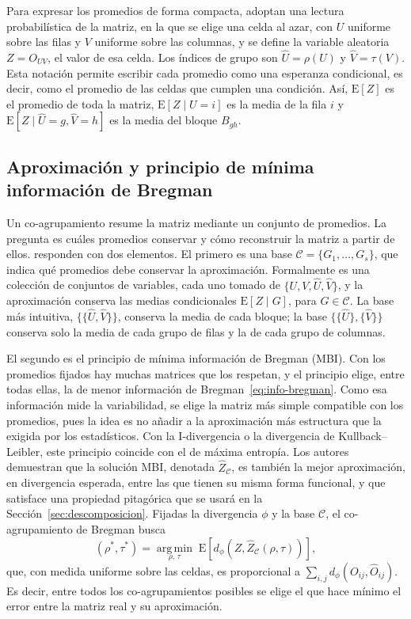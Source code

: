 Para expresar los promedios de forma compacta, \citet{Banerjee2007} adoptan una
lectura probabilística de la matriz, en la que se elige una celda al azar, con $U$ uniforme
sobre las filas y $V$ uniforme sobre las columnas, y se define la variable
aleatoria $Z = O_{UV}$, el valor de esa celda. Los índices de grupo son
$\hat{U} = \rho(U)$ y $\hat{V} = \tau(V)$. Esta notación permite escribir cada
promedio como una esperanza condicional, es decir, como el promedio de las celdas
que cumplen una condición. Así, $\mathrm{E}[Z]$ es el promedio de toda la matriz,
$\mathrm{E}[Z \mid U = i]$ es la media de la fila $i$ y
$\mathrm{E}[Z \mid \hat{U} = g, \hat{V} = h]$ es la media del bloque $B_{gh}$.

\subsection{Aproximación y principio de mínima información de Bregman}

Un co-agrupamiento resume la matriz mediante un conjunto de promedios. La pregunta
es cuáles promedios conservar y cómo reconstruir la matriz a partir de ellos.
\citet{Banerjee2007} responden con dos elementos. El primero es una base
$\mathcal{C} = \{G_1, \dots, G_s\}$, que indica qué
promedios debe conservar la aproximación. Formalmente es una colección de
conjuntos de variables, cada uno tomado de $\{U, V, \hat{U}, \hat{V}\}$, y la
aproximación conserva las medias condicionales $\mathrm{E}[Z \mid G]$, para
$G \in \mathcal{C}$. La base más intuitiva, $\{\{\hat{U}, \hat{V}\}\}$, conserva la
media de cada bloque; la base $\{\{\hat{U}\}, \{\hat{V}\}\}$ conserva solo la media
de cada grupo de filas y la de cada grupo de columnas.

El segundo es el principio de mínima información de Bregman (MBI). Con los
promedios fijados hay muchas matrices que los respetan, y el principio elige,
entre todas ellas, la de menor información de Bregman~\eqref{eq:info-bregman}.
Como esa información mide la variabilidad, se elige la matriz más simple
compatible con los promedios, pues la idea es no añadir a la aproximación más
estructura que la exigida por los estadísticos. Con la
I-divergencia o la divergencia de Kullback--Leibler, este principio coincide con el
de máxima entropía. Los autores demuestran que la solución MBI, denotada
$\hat{Z}_{\mathcal{C}}$, es también la mejor aproximación, en divergencia esperada,
entre las que tienen su misma forma funcional, y que satisface una propiedad
pitagórica \citep[Teorema~2 y Lema~3]{Banerjee2007} que se usará en la
Sección~\ref{sec:descomposicion}. Fijadas la divergencia $\phi$ y la base $\mathcal{C}$, el co-agrupamiento de
Bregman busca
\begin{equation}\label{eq:objetivo-bregman}
  (\rho^*, \tau^*) = \operatorname*{arg\,min}_{\rho,\, \tau}\;
  \mathrm{E}\!\left[ d_\phi\!\left(Z, \hat{Z}_{\mathcal{C}}(\rho, \tau)\right) \right],
\end{equation}
que, con medida uniforme sobre las celdas, es proporcional a
$\sum_{i,j} d_\phi(O_{ij}, \hat{O}_{ij})$. Es decir, entre todos los
co-agrupamientos posibles se elige el que hace mínimo el error entre la matriz
real y su aproximación.

